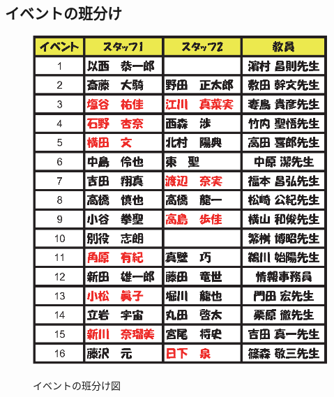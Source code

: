 \vspace{-3mm}
\subsection{イベントの班分け}
\begin{figure}[H]
\begin{center}

\includegraphics[scale=0.8]{./19/event_hanwake.eps}
\label{fig:Eventhanwake}
\caption{イベントの班分け図}
\end{center}
\end{figure}



%
